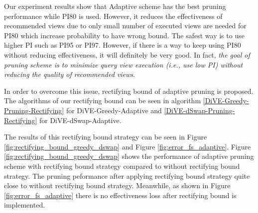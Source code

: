 \documentclass{article}
\begin{document}
%
%		



Our experiment results show that Adaptive scheme has the best pruning performance while PI80 is used. However, it reduces the effectiveness of recommended views due to only small number of executed views are needed for PI80 which increase probability to have wrong bound. The safest way is to use higher PI such as PI95 or PI97. However, if there is a way to keep using PI80 without reducing effectiveness, it will definitely be very good. In fact, \textit{the goal of pruning scheme is to minimize query view execution (i.e., use low PI) without reducing the quality of recommended views}. 


In order to overcome this issue, rectifying bound of adaptive pruning is proposed. The algorithms of our rectifying bound can be seen in algorithm \ref{DiVE-Greedy-Pruning-Rectifying} for DiVE-Greedy-Adaptive and \ref{DiVE-dSwap-Pruning-Rectifying} for DiVE-dSwap-Adaptive.  


The results of this rectifying bound strategy can be seen in Figure \ref{fig:rectifying_bound_greedy_dswap} and Figure \ref{fig:error_fs_adaptive}. Figure \ref{fig:rectifying_bound_greedy_dswap} shows the performance of adaptive pruning scheme with rectifying bound strategy compared to without rectifying bound strategy. The pruning peformance after applying rectifying bound strategy quite close to without rectifying bound strategy. Meanwhile, as shown in Figure \ref{fig:error_fs_adaptive} there is no effectiveness loss after rectifying bound is implemented. 

%
%		
\end{document}
